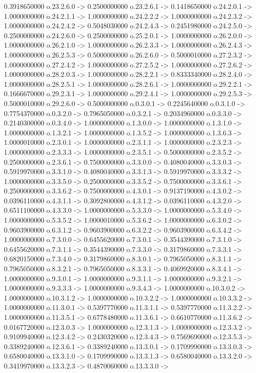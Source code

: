 0.3918650000    o.23.2.6.0 -> 0.2500000000    o.23.2.6.1 -> 0.1418650000    o.24.2.0.1 -> 1.0000000000    o.24.2.1.1 -> 1.0000000000    o.24.2.2.2 -> 1.0000000000    o.24.2.3.2 -> 1.0000000000    o.24.2.4.2 -> 0.5048030000    o.24.2.4.3 -> 0.2451980000    o.24.2.5.0 -> 0.2500000000    o.24.2.6.0 -> 0.2500000000    o.25.2.0.1 -> 1.0000000000    o.26.2.0.0 -> 1.0000000000    o.26.2.1.0 -> 1.0000000000    o.26.2.3.3 -> 1.0000000000    o.26.2.4.3 -> 1.0000000000    o.26.2.5.3 -> 0.5000000000    o.26.2.6.0 -> 0.5000010000    o.27.2.3.2 -> 1.0000000000    o.27.2.4.2 -> 1.0000000000    o.27.2.5.2 -> 1.0000000000    o.27.2.6.2 -> 1.0000000000    o.28.2.0.3 -> 1.0000000000    o.28.2.2.1 -> 0.8333340000    o.28.2.4.0 -> 1.0000000000    o.28.2.5.1 -> 1.0000000000    o.28.2.6.1 -> 1.0000000000    o.29.2.2.1 -> 0.1666670000    o.29.2.3.1 -> 1.0000000000    o.29.2.4.1 -> 1.0000000000    o.29.2.5.3 -> 0.5000010000    o.29.2.6.0 -> 0.5000000000    o.0.3.0.1 -> 0.2245640000    o.0.3.1.0 -> 0.7754370000    o.0.3.2.0 -> 0.7965050000    o.0.3.2.1 -> 0.2034960000    o.0.3.3.0 -> 0.2140300000    o.0.3.4.0 -> 1.0000000000    o.1.3.0.0 -> 1.0000000000    o.1.3.1.0 -> 1.0000000000    o.1.3.2.1 -> 1.0000000000    o.1.3.5.2 -> 1.0000000000    o.1.3.6.3 -> 1.0000010000    o.2.3.0.1 -> 1.0000000000    o.2.3.1.1 -> 1.0000000000    o.2.3.2.3 -> 1.0000000000    o.2.3.3.3 -> 1.0000000000    o.2.3.5.1 -> 0.5000000000    o.2.3.5.2 -> 0.2500000000    o.2.3.6.1 -> 0.7500000000    o.3.3.0.0 -> 0.4080040000    o.3.3.0.3 -> 0.5919970000    o.3.3.1.0 -> 0.4080040000    o.3.3.1.3 -> 0.5919970000    o.3.3.3.2 -> 1.0000000000    o.3.3.5.0 -> 0.2500000000    o.3.3.5.2 -> 0.7500000000    o.3.3.6.1 -> 0.2500000000    o.3.3.6.2 -> 0.7500000000    o.4.3.0.1 -> 0.9137190000    o.4.3.0.2 -> 0.0396110000    o.4.3.1.1 -> 0.3092800000    o.4.3.1.2 -> 0.0396110000    o.4.3.2.0 -> 0.6511100000    o.4.3.3.0 -> 1.0000000000    o.5.3.3.0 -> 1.0000000000    o.5.3.4.0 -> 1.0000000000    o.5.3.5.2 -> 1.0000010000    o.5.3.6.2 -> 1.0000000000    o.6.3.0.2 -> 0.9603900000    o.6.3.1.2 -> 0.9603900000    o.6.3.2.2 -> 0.9603900000    o.6.3.4.2 -> 1.0000000000    o.7.3.0.0 -> 0.6455620000    o.7.3.0.1 -> 0.3544390000    o.7.3.1.0 -> 0.6455620000    o.7.3.1.1 -> 0.3544390000    o.7.3.3.0 -> 0.3179860000    o.7.3.3.1 -> 0.6820150000    o.7.3.4.0 -> 0.3179860000    o.8.3.0.1 -> 0.7965050000    o.8.3.1.1 -> 0.7965050000    o.8.3.2.1 -> 0.7965050000    o.8.3.3.1 -> 0.4069920000    o.8.3.4.1 -> 1.0000000000    o.9.3.0.1 -> 1.0000000000    o.9.3.1.1 -> 1.0000000000    o.9.3.2.1 -> 1.0000000000    o.9.3.3.3 -> 1.0000000000    o.9.3.4.3 -> 1.0000000000    o.10.3.0.2 -> 1.0000000000    o.10.3.1.2 -> 1.0000000000    o.10.3.2.2 -> 1.0000000000    o.10.3.3.2 -> 1.0000000000    o.11.3.0.1 -> 0.5397770000    o.11.3.1.1 -> 0.5397770000    o.11.3.2.2 -> 1.0000000000    o.11.3.5.1 -> 0.6778480000    o.11.3.6.1 -> 0.6610770000    o.11.3.6.2 -> 0.0167720000    o.12.3.0.3 -> 1.0000000000    o.12.3.1.3 -> 1.0000000000    o.12.3.3.2 -> 0.9109940000    o.12.3.4.2 -> 0.2430320000    o.12.3.4.3 -> 0.7569690000    o.12.3.5.3 -> 0.3389240000    o.12.3.6.1 -> 0.3389240000    o.13.3.0.1 -> 0.1709990000    o.13.3.0.3 -> 0.6580040000    o.13.3.1.0 -> 0.1709990000    o.13.3.1.3 -> 0.6580040000    o.13.3.2.0 -> 0.3419970000    o.13.3.2.3 -> 0.4870060000    o.13.3.3.0 -> 
